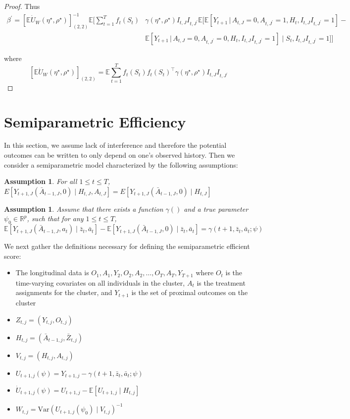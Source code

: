 \documentclass[12pt]{article}
\def\E{\mathbb{E}}
\def\given{\, | \,}
\newtheorem{assumption}[thm]{Assumption}
\begin{document}
\begin{proof}
Thus
\begin{align}
\label{eq:estimand_beta}
    \beta^\prime =\left[\E \dot U_W(\eta^\star,\rho^\star) \right]_{(2,2)}^{-1} \E \Bigg[\sum_{t=1}^T  f_t (S_t) &\gamma(\eta^\star,\rho^\star) I_{t,J}I_{t,J^\prime}  \E \Big[\E \left[Y_{t+1} \given{A_{t,J}=0,A_{t,J^\prime}=1, H_t ,I_{t,J}I_{t,J^\prime}=1} \right] - \nonumber \\
   &\E \left[Y_{t+1} \given{A_{t,J}=0,A_{t,J^\prime}=0, H_t ,I_{t,J}I_{t,J^\prime}=1} \right] \mid S_t,I_{t,J}I_{t,J^\prime}=1\Big]  \Bigg]
\end{align}

where
\[
\left[\E \dot U_W(\eta^\star,\rho^\star) \right]_{(2,2)} =\E \sum_{t=1}^T  f_t (S_t)f_t (S_t)^\top \gamma(\eta^\star,\rho^\star) I_{t,J}I_{t,J^\prime}
\]
\end{proof}

\section{Semiparametric Efficiency}
\label{app:semipareff}

In this section, we assume lack of interference and therefore the potential outcomes can be written to only depend on one's observed history.  Then we consider a semiparametric model characterized by the following assumptions:
\begin{assumption}
For all $1 \leq t \leq T$, $E[ Y_{t+1,J} (\bar A_{t-1,J}, 0) \mid H_{t,J}, A_{t,J} ] = E[ Y_{t+1,J} (\bar A_{t-1,J}, 0) \mid H_{t,J} ]$
\end{assumption}
\begin{assumption}
Assume that there exists a function $\gamma()$ and a true parameter $\psi_0 \in \mathbb{R}^p$, such that for any $1 \leq t \leq T$,
$$
\mathbb{E} \left[ Y_{t+1,J} (\bar A_{t-1,J}, a_t) \mid \bar z_t, \bar a_t \right] - \mathbb{E} \left[ Y_{t+1,J} (\bar A_{t-1,J}, 0) \mid \bar z_t, \bar a_t \right] = \gamma(t+1, \bar z_t, \bar a_t; \psi)
$$
\end{assumption}
We next gather the definitions necessary for defining the semiparametric efficient score:
\begin{itemize}
\item The longitudinal data is $O_1, A_1, Y_{2}, O_2, A_2, \ldots, O_T, A_T, Y_{T+1}$ where $O_t$ is the time-varying covariates on all individuals in the cluster, $A_t$ is the treatment assignments for the cluster, and $Y_{t+1}$ is the set of proximal outcomes on the cluster
\item $Z_{t,j} = (Y_{t,j}, O_{t,j})$
\item $H_{t,j} = (\bar A_{t-1,j}, \bar Z_{t,j})$
\item $V_{t,j} = (H_{t,j}, A_{t,j})$
\item $U_{t+1,j} (\psi) = Y_{t+1,j} - \gamma(t+1, \bar z_t, \bar a_t; \psi)$
\item $\dot{U}_{t+1,j} (\psi) = U_{t+1,j} - \mathbb{E} \left[ U_{t+1, j} \mid H_{t,j} \right]$
\item $W_{t,j} = \text{Var} \left( U_{t+1,j} (\psi_0) \mid V_{t,j} \right)^{-1}$
\end{itemize}
\end{document}
